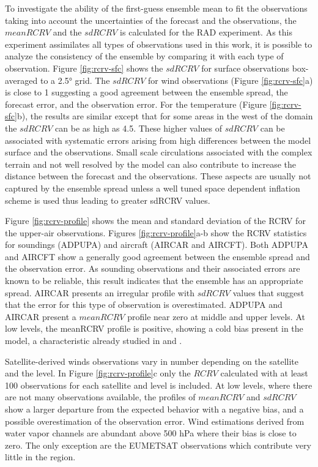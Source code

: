 \documentclass[preprint, 3p, authoryear,review, 12pt]{elsarticle} %
\begin{document}
To investigate the ability of the first-guess ensemble mean to fit the observations taking into account the uncertainties of the forecast and the observations, the \(mean RCRV\) and the \(sd RCRV\) is calculated for the RAD experiment. As this experiment assimilates all types of observations used in this work, it is possible to analyze the consistency of the ensemble by comparing it with each type of observation. Figure \ref{fig:rcrv-sfc} shows the \(sd RCRV\) for surface observations box-averaged to a 2.5° grid. The \(sd RCRV\) for wind observations (Figure \ref{fig:rcrv-sfc}a) is close to 1 suggesting a good agreement between the ensemble spread, the forecast error, and the observation error. For the temperature (Figure \ref{fig:rcrv-sfc}b), the results are similar except that for some areas in the west of the domain the \(sd RCRV\) can be as high as 4.5. These higher values of \(sdRCRV\) can be associated with systematic errors arising from high differences between the model surface and the observations. Small scale circulations associated with the complex terrain and not well resolved by the model can also contribute to increase the distance between the forecast and the observations. These aspects are usually not captured by the ensemble spread unless a well tuned space dependent inflation scheme is used thus leading to greater sdRCRV values.

Figure \ref{fig:rcrv-profile} shows the mean and standard deviation of the RCRV for the upper-air observations. Figures \ref{fig:rcrv-profile}a-b show the RCRV statistics for soundings (ADPUPA) and aircraft (AIRCAR and AIRCFT). Both ADPUPA and AIRCFT show a generally good agreement between the ensemble spread and the observation error. As sounding observations and their associated errors are known to be reliable, this result indicates that the ensemble has an appropriate spread. AIRCAR presents an irregular profile with \(sd RCRV\) values that suggest that the error for this type of observation is overestimated. ADPUPA and AIRCAR present a \(mean RCRV\) profile near zero at middle and upper levels. At low levels, the meanRCRV profile is positive, showing a cold bias present in the model, a characteristic already studied in \citet{ruiz2010} and \citet{dillon2021}.

Satellite-derived winds observations vary in number depending on the satellite and the level. In Figure \ref{fig:rcrv-profile}c only the \(RCRV\) calculated with at least 100 observations for each satellite and level is included. At low levels, where there are not many observations available, the profiles of \(mean RCRV\) and \(sd RCRV\) show a larger departure from the expected behavior with a negative bias, and a possible overestimation of the observation error. Wind estimations derived from water vapor channels are abundant above 500 hPa where their bias is close to zero. The only exception are the EUMETSAT observations which contribute very little in the region.
\end{document}
